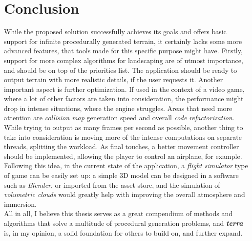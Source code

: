 \chapter{Conclusion}

\pagestyle{fancy}

\label{conclusion}

While the proposed solution successfully achieves its goals and offers basic support for infinite procedurally generated terrain, it certainly lacks some more advanced features, that tools made for this specific purpose might have. Firstly, support for more complex algorithms for landscaping are of utmost importance, and should be on top of the priorities list. The application should be ready to output terrain with more realistic details, if the user requests it. Another important aspect is further optimization. If used in the context of a video game, where a lot of other factors are taken into consideration, the performance might drop in intense situations, where the engine struggles. Areas that need more attention are \textit{collision map} generation speed and overall \textit{code refactorization}. While trying to output as many frames per second as possible, another thing to take into consideration is moving more of the intense computations on separate threads, splitting the workload. As final touches, a better movement controller should be implemented, allowing the player to control an airplane, for example. Following this idea, in the current state of the application, a \textit{flight simulator} type of game can be easily set up: a simple 3D model can be designed in a software such as \textit{Blender}, or imported from the asset store, and the simulation of \textit{volumetric clouds} would greatly help with improving the overall atmosphere and immersion.\\

All in all, I believe this thesis serves as a great compendium of methods and algorithms that solve a multitude of procedural generation problems, and \textbf{\textit{terra}} is, in my opinion, a solid foundation for others to build on, and further expand.